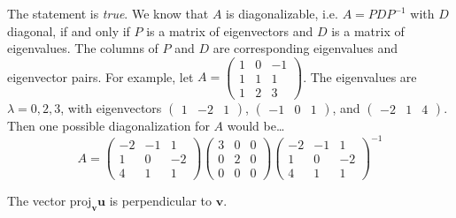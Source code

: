\documentclass[11pt,letterpaper]{article}
\begin{document}
\sol The statement is \textit{true}. We know that $A$ is diagonalizable, i.e. $A= PDP^{-1}$ with $D$ diagonal, if and only if $P$ is a matrix of eigenvectors and $D$ is a matrix of eigenvalues. The columns of $P$ and $D$ are corresponding eigenvalues and eigenvector pairs. For example, let $A= \begin{pmatrix} 1 & 0 & -1 \\ 1 & 1 & 1 \\ 1 & 2 & 3 \end{pmatrix}$. The eigenvalues are $\lambda= 0, 2, 3$, with eigenvectors $\begin{pmatrix} 1 & -2 & 1 \end{pmatrix}$, $\begin{pmatrix} -1 & 0 & 1 \end{pmatrix}$, and $\begin{pmatrix} -2 & 1 & 4 \end{pmatrix}$. Then one possible diagonalization for $A$ would be\dots
	\[
	A= \begin{pmatrix} -2 & -1 & 1 \\ 1 & 0 & -2 \\ 4 & 1 & 1 \end{pmatrix} \begin{pmatrix} 3 & 0 & 0 \\ 0 & 2 & 0 \\ 0 & 0 & 0 \end{pmatrix} \begin{pmatrix} -2 & -1 & 1 \\ 1 & 0 & -2 \\ 4 & 1 & 1 \end{pmatrix}^{-1}
	\] \pvspace{0.8cm}



 The vector $\text{proj}_{\mathbf{v}} \mathbf{u}$ is perpendicular to $\mathbf{v}$. \pspace
\end{document}
